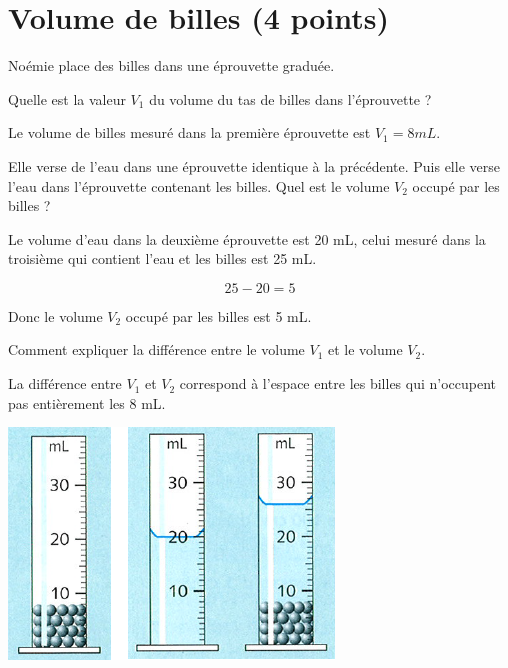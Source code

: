 \section{Volume de billes (4 points)}


\begin{multicols}{2}
	

Noémie place des billes dans une éprouvette graduée.

\begin{questions}
	\question[1] Quelle est la valeur $V_1$ du volume du tas de billes dans l'éprouvette ? 
	
	\begin{solution}
		Le volume de billes mesuré dans la première éprouvette est $V_1 = 8 mL$. 
	\end{solution}
	
	\question[1\half] Elle verse de l'eau dans une éprouvette identique à la précédente. Puis elle verse l'eau dans l'éprouvette contenant les billes. Quel est le volume $V_2$ occupé par les billes ?
	\begin{solution}
		Le volume d'eau dans la deuxième éprouvette est 20 mL, celui mesuré dans la troisième qui contient l'eau et les billes est 25 mL.
		
		\begin{equation*}
			25 - 20 = 5
		\end{equation*}
		
		Donc le volume $V_2$ occupé par les billes est 5 mL.
	\end{solution}
	
	\question[1\half] Comment expliquer la différence entre le volume $V_1$ et le volume $V_2$.
	\begin{solution}
		La différence entre $V_1$ et $V_2$ correspond à l'espace entre les billes qui n'occupent pas entièrement les 8 mL. 
	\end{solution}
\end{questions}


\begin{center}
	\includegraphics[scale=0.9]{img/billes}
\end{center}
\end{multicols}